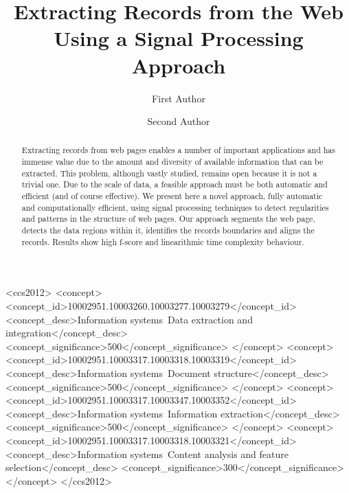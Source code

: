 \documentclass[sigconf]{acmart}
\begin{document}
\title{Extracting Records from the Web Using a Signal Processing Approach}

\author{First Author}

\author{Second Author}

\iffalse
\author{Roberto Panerai Velloso}
\affiliation{%
  \institution{Universidade Federal de Santa Catarina}
  \city{Florianópolis} 
  \state{Santa Catarina} 
  \country{Brazil}
}
\email{rvelloso@gmail.com}

\author{Carina F. Dorneles}
\affiliation{%
  \institution{Universidade Federal de Santa Catarina}
  \city{Florianópolis} 
  \state{Santa Catarina} 
  \country{Brazil}
}
\email{dorneles@inf.ufsc.br}
\fi

\begin{abstract}
Extracting records from web pages enables a number of important
applications and has immense value due to the amount and diversity of
available information that can be extracted. This problem, although vastly
studied, remains open because it is not a trivial one. Due to the scale of data,
a feasible approach must be both automatic and efficient (and of course
effective). We present here a novel approach, fully automatic and
computationally efficient, using signal processing techniques to detect
regularities and patterns in the structure of web pages. Our approach segments
the web page, detects the data regions within it, identifies the records
boundaries and aligns the records. Results show high f-score and
linearithmic time complexity behaviour.
\end{abstract}

%
%
\begin{CCSXML}
<ccs2012>
<concept>
<concept_id>10002951.10003260.10003277.10003279</concept_id>
<concept_desc>Information systems~Data extraction and integration</concept_desc>
<concept_significance>500</concept_significance>
</concept>
<concept>
<concept_id>10002951.10003317.10003318.10003319</concept_id>
<concept_desc>Information systems~Document structure</concept_desc>
<concept_significance>500</concept_significance>
</concept>
<concept>
<concept_id>10002951.10003317.10003347.10003352</concept_id>
<concept_desc>Information systems~Information extraction</concept_desc>
<concept_significance>500</concept_significance>
</concept>
<concept>
<concept_id>10002951.10003317.10003318.10003321</concept_id>
<concept_desc>Information systems~Content analysis and feature selection</concept_desc>
<concept_significance>300</concept_significance>
</concept>
</ccs2012>
\end{CCSXML}
\end{document}
